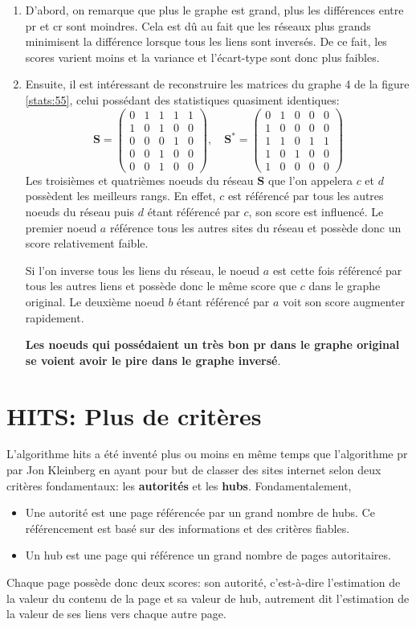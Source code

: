 \documentclass[12pt,twoside, openright]{memoir}
\begin{document}
	\begin{enumerate}
		\item D'abord, on remarque que plus le graphe est grand, plus les différences entre \gls{pr} et \gls{cr} sont moindres. Cela est dû au fait que les réseaux plus grands minimisent la différence lorsque tous les liens sont inversés. De ce fait, les scores varient moins et la variance et l'écart-type sont donc plus faibles.
		\item Ensuite, il est intéressant de reconstruire les matrices du graphe 4 de la figure \ref{stats:55}, celui possédant des statistiques quasiment identiques:
		$$\textbf{S}=\begin{pmatrix}0&1&1&1&1\\1&0&1&0&0\\0&0&0&1&0\\0&0&1&0&0\\0&0&1&0&0\end{pmatrix},\quad
		\textbf{S}^*=\begin{pmatrix}0&1&0&0&0\\1&0&0&0&0\\1&1&0&1&1\\1&0&1&0&0\\1&0&0&0&0\end{pmatrix}$$
		Les troisièmes et quatrièmes noeuds du réseau $\textbf{S}$ que l'on appelera $c$ et $d$ possèdent les meilleurs rangs. En effet, $c$ est référencé par tous les autres noeuds du réseau puis $d$ étant référencé par $c$, son score est influencé. Le premier noeud $a$ référence tous les autres sites du réseau et possède donc un score relativement faible.\par
		Si l'on inverse tous les liens du réseau, le noeud $a$ est cette fois référencé par tous les autres liens et possède donc le même score que $c$ dans le graphe original. Le deuxième noeud $b$ étant référencé par $a$ voit son score augmenter rapidement.\par
		\textbf{Les noeuds qui possédaient un très bon \gls{pr} dans le graphe original se voient avoir le pire dans le graphe inversé}.
	\end{enumerate}
	\section{HITS: Plus de critères}
	L'algorithme \gls{hits} a été inventé plus ou moins en même temps que l'algorithme \gls{pr} par Jon Kleinberg en ayant pour but de classer des sites internet selon deux critères fondamentaux: les \textbf{autorités} et les \textbf{hubs}. Fondamentalement,
	\begin{itemize}
		\item Une autorité est une page référencée par un grand nombre de hubs. Ce référencement est basé sur des informations et des critères fiables.
		\item Un hub est une page qui référence un grand nombre de pages autoritaires.
	\end{itemize}
	Chaque page possède donc deux scores: son autorité, c'est-à-dire l'estimation de la valeur du contenu de la page et sa valeur de hub, autrement dit l'estimation de la valeur de ses liens vers chaque autre page.
\end{document}
